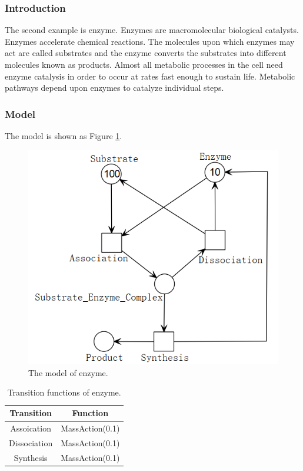 \documentclass[journal,a4paper,onecolumn]{article}
\begin{document}
\subsubsection{Introduction}
The second example is enzyme. Enzymes are macromolecular biological catalysts. Enzymes accelerate chemical reactions. The molecules upon which enzymes may act are called substrates and the enzyme converts the substrates into different molecules known as products. Almost all metabolic processes in the cell need enzyme catalysis in order to occur at rates fast enough to sustain life. Metabolic pathways depend upon enzymes to catalyze individual steps. \cite{enzyme}
\subsubsection{Model}
The model is shown as Figure \ref{fig:The model of enzyme}.
\begin{figure}[!hbt]
	\begin{center}
		\includegraphics[width=\columnwidth]{fig25}
		\caption{The model of enzyme.}
		\label{fig:The model of enzyme}
	\end{center}
\end{figure}
\begin{table}[!hbt]
	\begin{center}
		\caption{Transition functions of enzyme.}
		\label{Transition functions of enzyme}
		\begin{tabular}{|c|c|}
			\hline
			Transition&Function\\
			\hline
			Assoication&MassAction(0.1)\\
			\hline
			Dissociation&MassAction(0.1)\\
			\hline
			Synthesis&MassAction(0.1)\\
			\hline
		\end{tabular}
	\end{center}
\end{table}
\end{document}
